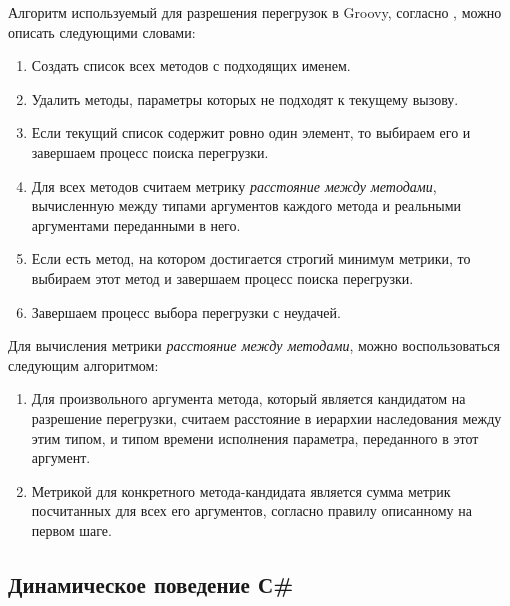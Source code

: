 

Алгоритм используемый для разрешения перегрузок в Groovy, согласно \cite{groovy:selectingOverloadsAtRuntime}, можно описать следующими словами:

\begin{enumerate}
    \item Создать список всех методов с подходящих именем.
    \item Удалить методы, параметры которых не подходят к текущему вызову.
    \item Если текущий список содержит ровно один элемент, то выбираем его и завершаем процесс поиска перегрузки.
    \item Для всех методов считаем метрику \textit{расстояние между методами}, вычисленную между типами аргументов каждого метода и реальными аргументами переданными в него.
    \item Если есть метод, на котором достигается строгий минимум метрики, то выбираем этот метод и завершаем процесс поиска перегрузки.
    \item Завершаем процесс выбора перегрузки с неудачей.
\end{enumerate}

Для вычисления метрики \textit{расстояние между методами}, можно воспользоваться следующим алгоритмом:
\begin{enumerate}
    \item Для произвольного аргумента метода, который является кандидатом на разрешение перегрузки, считаем расстояние в иерархии наследования между этим типом, и типом времени исполнения параметра, переданного в этот аргумент.
    \item Метрикой для конкретного метода-кандидата является сумма метрик посчитанных для всех его аргументов, согласно правилу описанному на первом шаге.
\end{enumerate}

\subsection{Динамическое поведение С{\#}}
\label{sec:dynamicBehaviorSCharp}

